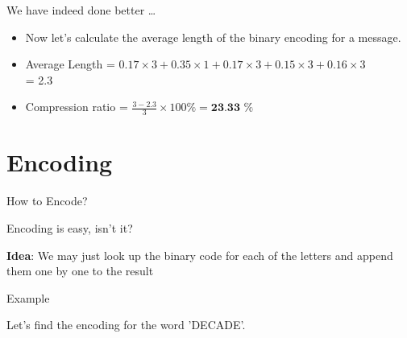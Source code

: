\documentclass{beamer}
\begin{document}
	\begin{frame}{We have indeed done better \ldots}
		
		\begin{block}{}
			\centering
			\begin{itemize}
				\item Now let's calculate the average length of the binary encoding for a message. \\
				
				\item Average Length = $0.17 \times 3 + 0.35 \times 1 + 0.17 \times 3 + 0.15 \times 3 + 0.16 \times 3$  \\
				
				\hspace{26mm} = 2.3
				
				\item Compression ratio = $\frac{3-2.3}{3} \times 100 \% = \textbf{23.33 \%} $
				
			\end{itemize}
			
			
			
		\end{block}
		
		
	\end{frame}
	
	\section{Encoding}
	\setbeamercovered{}
	\begin{frame}{How to Encode?}
		
		\begin{block}{Encoding is easy, isn't it?}
			
			\textbf{Idea}: We may just look up the binary code for each of the letters and append them one by one to the result
			
		\end{block}
		
	\end{frame}
	
	\begin{frame}{Example}
		
		\begin{example}
			
			Let's find the encoding for the word 'DECADE'.
			
		\end{example}
		
	\end{frame}
	
\end{document}
